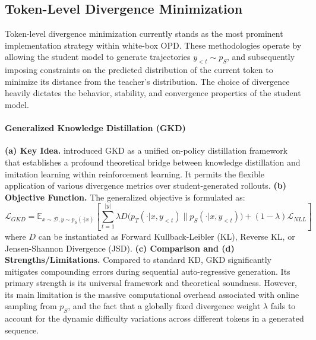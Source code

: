\documentclass{article} %
\begin{document}
\subsection{Token-Level Divergence Minimization}
\label{subsec:token_level}

Token-level divergence minimization currently stands as the most prominent implementation strategy within white-box OPD. These methodologies operate by allowing the student model to generate trajectories $y_{<t} \sim p_S$, and subsequently imposing constraints on the predicted distribution of the current token to minimize its distance from the teacher's distribution. The choice of divergence heavily dictates the behavior, stability, and convergence properties of the student model.

\paragraph{Generalized Knowledge Distillation (GKD)}
\textbf{(a) Key Idea.} \citet{2306.13649} introduced GKD as a unified on-policy distillation framework that establishes a profound theoretical bridge between knowledge distillation and imitation learning within reinforcement learning. It permits the flexible application of various divergence metrics over student-generated rollouts.
\textbf{(b) Objective Function.} The generalized objective is formulated as:
\begin{equation}
    \mathcal{L}_{GKD} = \mathbb{E}_{x \sim \mathcal{D}, y \sim p_S(\cdot|x)} \left[ \sum_{t=1}^{|y|} \lambda D\big( p_T(\cdot|x, y_{<t}) \parallel p_S(\cdot|x, y_{<t}) \big) + (1-\lambda) \mathcal{L}_{NLL} \right]
    \label{eq:gkd}
\end{equation}
where $D$ can be instantiated as Forward Kullback-Leibler (KL), Reverse KL, or Jensen-Shannon Divergence (JSD).
\textbf{(c) Comparison and (d) Strengths/Limitations.} Compared to standard KD, GKD significantly mitigates compounding errors during sequential auto-regressive generation. Its primary strength is its universal framework and theoretical soundness. However, its main limitation is the massive computational overhead associated with online sampling from $p_S$, and the fact that a globally fixed divergence weight $\lambda$ fails to account for the dynamic difficulty variations across different tokens in a generated sequence.
\end{document}
